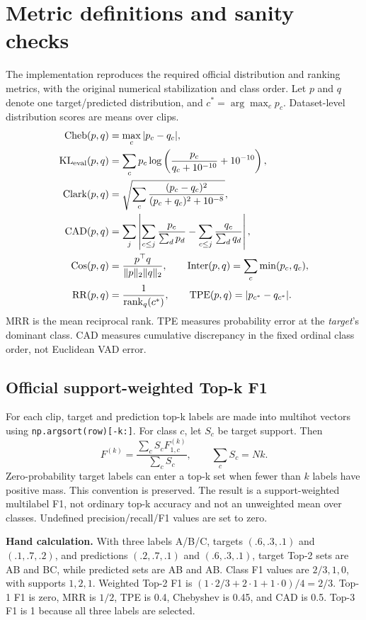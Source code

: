 \documentclass[11pt,a4paper]{article}
\newcommand{\code}[1]{\texttt{#1}}
\begin{document}
\section{Metric definitions and sanity checks}
The implementation reproduces the required official distribution and ranking metrics, with the original numerical stabilization and class order. Let $p$ and $q$ denote one target/predicted distribution, and $c^*=\arg\max_c p_c$. Dataset-level distribution scores are means over clips.
\begin{align}
\operatorname{Cheb}(p,q)&=\max_c|p_c-q_c|,\\
\operatorname{KL}_{\rm eval}(p,q)&=\sum_c p_c\log\left(\frac{p_c}{q_c+10^{-10}}+10^{-10}\right),\\
\operatorname{Clark}(p,q)&=\sqrt{\sum_c\frac{(p_c-q_c)^2}{(p_c+q_c)^2+10^{-8}}},\\
\operatorname{CAD}(p,q)&=\sum_j\left|\sum_{c\le j}\frac{p_c}{\sum_d p_d}-\sum_{c\le j}\frac{q_c}{\sum_d q_d}\right|,\\
\operatorname{Cos}(p,q)&=\frac{p^\top q}{\|p\|_2\|q\|_2},\qquad
\operatorname{Inter}(p,q)=\sum_c\min(p_c,q_c),\\
\operatorname{RR}(p,q)&=\frac{1}{\operatorname{rank}_{q}(c^*)},\qquad
\operatorname{TPE}(p,q)=|p_{c^*}-q_{c^*}|.
\end{align}
MRR is the mean reciprocal rank. TPE measures probability error at the \emph{target}'s dominant class. CAD measures cumulative discrepancy in the fixed ordinal class order, not Euclidean VAD error.

\subsection{Official support-weighted Top-k F1}
For each clip, target and prediction top-k labels are made into multihot vectors using \code{np.argsort(row)[-k:]}. For class $c$, let $S_c$ be target support. Then
\begin{equation}
F^{(k)}=\frac{\sum_c S_cF_{1,c}^{(k)}}{\sum_c S_c},\qquad \sum_c S_c=Nk.
\end{equation}
Zero-probability target labels can enter a top-k set when fewer than $k$ labels have positive mass. This convention is preserved. The result is a support-weighted multilabel F1, not ordinary top-k accuracy and not an unweighted mean over classes. Undefined precision/recall/F1 values are set to zero.

\textbf{Hand calculation.} With three labels A/B/C, targets $(.6,.3,.1)$ and $(.1,.7,.2)$, and predictions $(.2,.7,.1)$ and $(.6,.3,.1)$, target Top-2 sets are AB and BC, while predicted sets are AB and AB. Class F1 values are $2/3,1,0$, with supports $1,2,1$. Weighted Top-2 F1 is $(1\cdot2/3+2\cdot1+1\cdot0)/4=2/3$. Top-1 F1 is zero, MRR is $1/2$, TPE is 0.4, Chebyshev is 0.45, and CAD is 0.5. Top-3 F1 is 1 because all three labels are selected.
\end{document}
